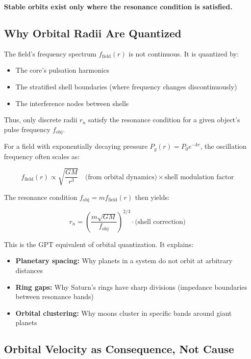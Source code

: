 \documentclass[12pt, a4paper]{article}
\begin{document}
\textbf{Stable orbits exist only where the resonance condition is satisfied.}

\subsection{Why Orbital Radii Are Quantized}
\label{subsec:quantized_radii}

The field's frequency spectrum \( f_{\text{field}}(r) \) is not continuous. It is quantized by:
\begin{itemize}
    \item The core's pulsation harmonics
    \item The stratified shell boundaries (where frequency changes discontinuously)
    \item The interference nodes between shells
\end{itemize}

Thus, only discrete radii \( r_n \) satisfy the resonance condition for a given object's pulse frequency \( f_{\text{obj}} \).

For a field with exponentially decaying pressure \( P_g(r) = P_0 e^{-kr} \), the oscillation frequency often scales as:

\[
f_{\text{field}}(r) \propto \sqrt{\frac{GM}{r^3}} \quad \text{(from orbital dynamics)} \times \text{shell modulation factor}
\]

The resonance condition \( f_{\text{obj}} = m f_{\text{field}}(r) \) then yields:

\[
r_n = \left( \frac{m \sqrt{GM}}{f_{\text{obj}}} \right)^{2/3} \cdot \text{(shell correction)}
\]

This is the GPT equivalent of orbital quantization. It explains:

\begin{itemize}
    \item \textbf{Planetary spacing:} Why planets in a system do not orbit at arbitrary distances
    \item \textbf{Ring gaps:} Why Saturn's rings have sharp divisions (impedance boundaries between resonance bands)
    \item \textbf{Orbital clustering:} Why moons cluster in specific bands around giant planets
\end{itemize}

\subsection{Orbital Velocity as Consequence, Not Cause}
\label{subsec:orbital_velocity}
\end{document}
